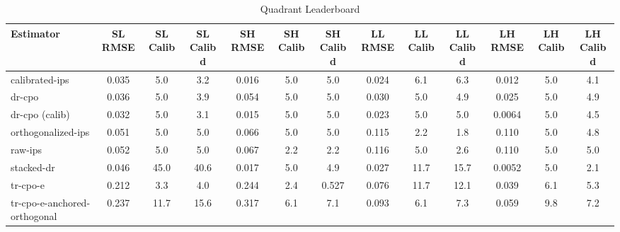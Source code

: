\begin{table}[htbp]
\centering
\caption{Quadrant Leaderboard}
\label{tab:A1}
\begin{tabular}{l|cccccccccccc}
\toprule
Estimator & SL RMSE & SL Calib & SL Calib d & SH RMSE & SH Calib & SH Calib d & LL RMSE & LL Calib & LL Calib d & LH RMSE & LH Calib & LH Calib d \\
\midrule
calibrated-ips & 0.035 & 5.0 & 3.2 & 0.016 & 5.0 & 5.0 & 0.024 & 6.1 & 6.3 & 0.012 & 5.0 & 4.1 \\
dr-cpo & 0.036 & 5.0 & 3.9 & 0.054 & 5.0 & 5.0 & 0.030 & 5.0 & 4.9 & 0.025 & 5.0 & 4.9 \\
dr-cpo (calib) & 0.032 & 5.0 & 3.1 & 0.015 & 5.0 & 5.0 & 0.023 & 5.0 & 5.0 & 0.0064 & 5.0 & 4.5 \\
orthogonalized-ips & 0.051 & 5.0 & 5.0 & 0.066 & 5.0 & 5.0 & 0.115 & 2.2 & 1.8 & 0.110 & 5.0 & 4.8 \\
raw-ips & 0.052 & 5.0 & 5.0 & 0.067 & 2.2 & 2.2 & 0.116 & 5.0 & 2.6 & 0.110 & 5.0 & 5.0 \\
stacked-dr & 0.046 & 45.0 & 40.6 & 0.017 & 5.0 & 4.9 & 0.027 & 11.7 & 15.7 & 0.0052 & 5.0 & 2.1 \\
tr-cpo-e & 0.212 & 3.3 & 4.0 & 0.244 & 2.4 & 0.527 & 0.076 & 11.7 & 12.1 & 0.039 & 6.1 & 5.3 \\
tr-cpo-e-anchored-orthogonal & 0.237 & 11.7 & 15.6 & 0.317 & 6.1 & 7.1 & 0.093 & 6.1 & 7.3 & 0.059 & 9.8 & 7.2 \\
\bottomrule
\end{tabular}
\end{table}
